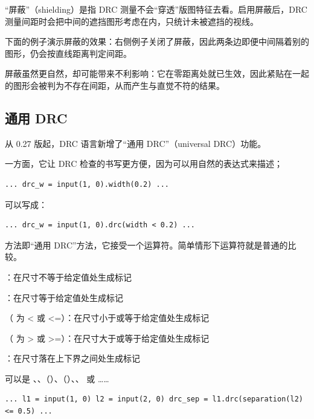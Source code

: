 “屏蔽”（shielding）是指 DRC 测量不会“穿透”版图特征去看。启用屏蔽后，DRC 测量间距时会把中间的遮挡图形考虑在内，只统计未被遮挡的视线。

下面的例子演示屏蔽的效果：右侧例子关闭了屏蔽，因此两条边即便中间隔着别的图形，仍会按直线距离判定间距。

屏蔽虽然更自然，却可能带来不利影响：它在零距离处就已生效，因此紧贴在一起的图形会被判为不存在间距，从而产生与直觉不符的结果。

\subsection{通用 DRC}

从 0.27 版起，DRC 语言新增了“通用 DRC”（universal DRC）功能。

一方面，它让 DRC 检查的书写更方便，因为可以用自然的表达式来描述；

\begin{lstlisting}
... drc_w = input(1, 0).width(0.2) ...
\end{lstlisting}

可以写成：

\begin{lstlisting}
... drc_w = input(1, 0).drc(width < 0.2) ...
\end{lstlisting}

 方法即“通用 DRC”方法，它接受一个运算符。简单情形下运算符就是普通的比较。

\begin{kldesc}
\item {}：在尺寸不等于给定值处生成标记
\item {}：在尺寸等于给定值处生成标记
\item {}（ 为 < 或 <=）：在尺寸小于或等于给定值处生成标记
\item {}（ 为 > 或 >=）：在尺寸大于或等于给定值处生成标记
\item {}：在尺寸落在上下界之间处生成标记
\end{kldesc}

 可以是 、、（）、（）、、 或 ……

\begin{lstlisting}
... l1 = input(1, 0) l2 = input(2, 0) drc_sep = l1.drc(separation(l2) <= 0.5) ...
\end{lstlisting}


